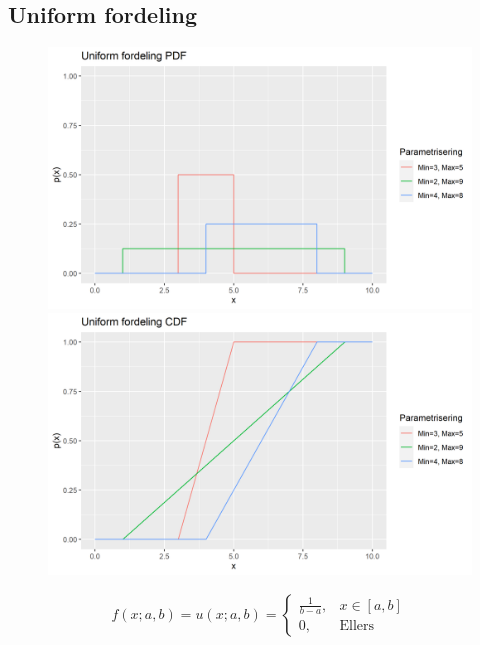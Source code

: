 \subsection{Uniform fordeling}
\begin{figure}[H]
  \centering
  \begin{minipage}[b]{0.49\textwidth}
\includegraphics[width=\textwidth]{bilete/unifpdf.png}
  \end{minipage}
  \hfill
  \begin{minipage}[b]{0.49\textwidth}
    \includegraphics[width=\textwidth]{bilete/unifcdf.png}
  \end{minipage}
\end{figure}

\begin{equation}
    f(x; a, b) = u(x; a, b) = 
    \begin{cases}
    \frac{1}{b - a}, & x \in [a, b] \\
    0, & \text{Ellers}
    \end{cases}
\end{equation}

